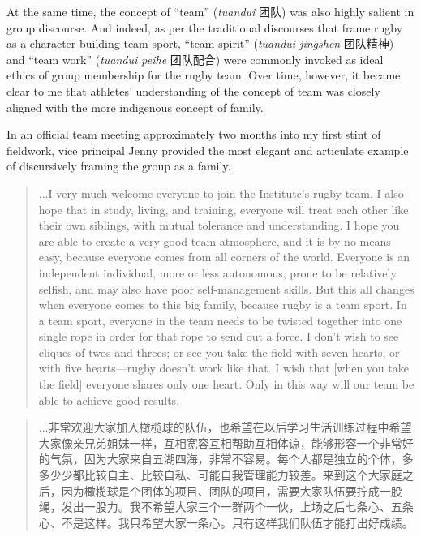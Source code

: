 \begin{CJK}{UTF8}{gbsn}
At the same time, the concept of ``team'' (\textit{tuandui} 团队) was also highly salient in group discourse. And indeed, as per the traditional discourses that frame rugby as a character-building team sport, ``team spirit'' (\textit{tuandui jingshen} 团队精神) and ``team work'' (\textit{tuandui peihe} 团队配合) were commonly invoked as ideal ethics of group membership for the rugby team.   Over time, however, it became clear to me that athletes' understanding of the concept of team was closely aligned with the more indigenous concept of family.

In an official team meeting approximately two months into my first stint of fieldwork, vice principal Jenny provided the most elegant and articulate example of discursively framing the group as a family.

    \begin{quotation}
      ...I very much welcome everyone to join the Institute's rugby team. I also hope that in study, living, and training, everyone will treat each other like their own siblings, with mutual tolerance and understanding.  I hope you are able to create a very good team atmosphere, and it is by no means easy, because everyone comes from all corners of the world. Everyone is an independent individual, more or less autonomous, prone to be relatively selfish, and may also have poor self-management skills.  But this all changes when everyone comes to this big family, because rugby is a team sport. In a team sport, everyone in the team needs to be twisted together into one single rope in order for that rope to send out a force. I don't wish to see cliques of twos and threes; or see you take the field with seven hearts, or with five hearts---rugby doesn't work like that. I wish that [when you take the field] everyone shares only one heart. Only in this way will our team be able to achieve good results.
    \end{quotation}

    \begin{quotation}
      ...非常欢迎大家加入橄榄球的队伍，也希望在以后学习生活训练过程中希望大家像亲兄弟姐妹一样，互相宽容互相帮助互相体谅，能够形容一个非常好的气氛，因为大家来自五湖四海，非常不容易。每个人都是独立的个体，多多少少都比较自主、比较自私、可能自我管理能力较差。来到这个大家庭之后，因为橄榄球是个团体的项目、团队的项目，需要大家队伍要拧成一股绳，发出一股力。我不希望大家三个一群两个一伙，上场之后七条心、五条心、不是这样。我只希望大家一条心。只有这样我们队伍才能打出好成绩。
    \end{quotation}


\end{CJK}
